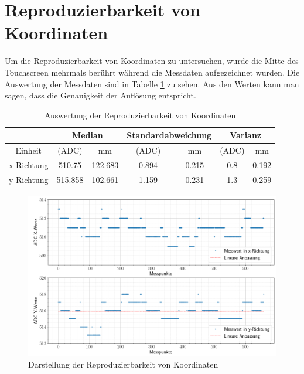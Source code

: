 \section{Reproduzierbarkeit von Koordinaten}
\label{ab:wiederholung}
Um die Reproduzierbarkeit von Koordinaten zu untersuchen, wurde die Mitte des Touchscreen mehrmals berührt während die Messdaten aufgezeichnet wurden. 
Die Auswertung der Messdaten sind in Tabelle \ref{tab:wiederholung} zu sehen. Aus den Werten kann man sagen, dass die Genauigkeit der Auflösung entspricht.
\begin{table}[ht!]
    \caption{Auswertung der Reproduzierbarkeit von Koordinaten}
    \begin{center}
        \begin{tabular}{ |c|c|c|c|c|c|c| }
          \hline  
         &\multicolumn{2}{c|}{Median}& \multicolumn{2}{c|}{Standardabweichung}&\multicolumn{2}{c|}{Varianz} \\ \hline
         Einheit    &(ADC)              &mm             &(ADC)          &mm             &(ADC)          &mm\\\hline
         x-Richtung & \SI{510,75}{}    & \SI{122,683}{}&\SI{0,894}{}   &\SI{0,215}{}   &\SI{0,8}{}     & \SI{0,192}{} \\  \hline
         y-Richtung & \SI{515,858}{}    & \SI{102,661}{}&\SI{1,159}{}   &\SI{0,231}{}   &\SI{1,3}{}     & \SI{0,259}{} \\ \hline  
        \end{tabular}
        \label{tab:wiederholung}
    \end{center}   
\end{table}


\begin{figure}[ht!]
    \centering
    \includegraphics[width=\linewidth]{fig/wiederholung.png}
    \caption{Darstellung der Reproduzierbarkeit von Koordinaten}
    \label{fig:wiederholung}
\end{figure}
